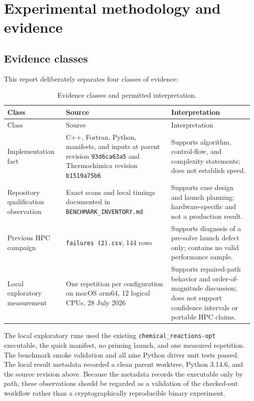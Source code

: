 \documentclass[11pt]{article}
\newcommand{\code}[1]{\texttt{#1}}
\begin{document}
\section{Experimental methodology and evidence}

\subsection{Evidence classes}

This report deliberately separates four classes of evidence:
\begin{longtable}{L{0.18\textwidth}L{0.31\textwidth}L{0.43\textwidth}}
  \caption{Evidence classes and permitted interpretation.}
  \label{tab:evidence-classes}\\
  \toprule
  Class & Source & Interpretation \\
  \midrule
  \endfirsthead
  \toprule
  Class & Source & Interpretation \\
  \midrule
  \endhead
  Implementation fact &
  C++, Fortran, Python, manifests, and inputs at parent revision
  \code{93d6ca63a5} and Thermochimica revision \code{b1519a75b6} &
  Supports algorithm, control-flow, and complexity statements; does not establish speed. \\
  Repository qualification observation &
  Exact scans and local timings documented in \code{BENCHMARK\_INVENTORY.md} &
  Supports case design and launch planning; hardware-specific and not a production result. \\
  Previous HPC campaign &
  \code{failures (2).csv}, 144 rows &
  Supports diagnosis of a pre-solve launch defect only; contains no valid performance sample. \\
  Local exploratory measurement &
  One repetition per configuration on macOS arm64, 12 logical CPUs, 28 July 2026 &
  Supports repaired-path behavior and order-of-magnitude discussion; does not support confidence
  intervals or portable HPC claims. \\
  \bottomrule
\end{longtable}

The local exploratory runs used the existing \code{chemical\_reactions-opt} executable, the quick
manifest, no priming launch, and one measured repetition.  The benchmark smoke validation and all
nine Python driver unit tests passed.  The local result metadata recorded a clean parent worktree,
Python 3.14.6, and the source revision above.  Because the metadata records the executable only by
path, these observations should be regarded as a validation of the checked-out workflow rather
than a cryptographically reproducible binary experiment.
\end{document}
